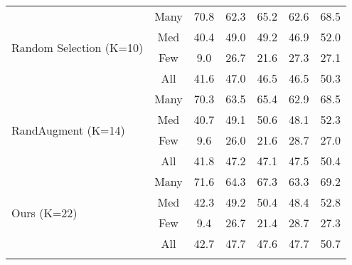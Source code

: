 \documentclass{article}
\newcommand{\thickhline}{\hlineB{4}}
\begin{document}
{\begin{table}[ht]
{{\begin{tabular}{l|c|ccccc}
\multirow{4}{*}{Random Selection (K=10)}                      & Many                         & 70.8                   & 62.3                       & 65.2                         & 62.6                   & 68.5                     \\
                                                & Med                          & 40.4                   & 49.0                       & 49.2                         & 46.9                   & 52.0                     \\
                                                & Few                          & 9.0                    & 26.7                       & 21.6                         & 27.3                   & 27.1                     \\
                                                & All                          & 41.6                   & 47.0                       & 46.5                         & 46.5                   & 50.3                     \\  \midrule
\multirow{4}{*}{RandAugment (K=14)}                    & Many                         & 70.3                   & 63.5                       & 65.4                         & 62.9                   & 68.5                     \\
                                                & Med                          & 40.7                   & 49.1                       & 50.6                         & 48.1                   & 52.3                     \\
                                                & Few                          & 9.6                    & 26.0                       & 21.6                         & 28.7                   & 27.0                     \\
                                                & All                          & 41.8                   & 47.2                       & 47.1                         & 47.5                   & 50.4                     \\  \midrule
\multirow{4}{*}{Ours (K=22)}                    & Many                         & 71.6                   & 64.3                       & 67.3                         & 63.3                   & 69.2                     \\
                                                & Med                          & 42.3                   & 49.2                       & 50.4                         & 48.4                   & 52.8                     \\
                                                & Few                          & 9.4                    & 26.7                       & 21.4                         & 28.7                   & 27.3                     \\
                                                & All                          & 42.7                   & 47.7                       & 47.6                         & 47.7                   & 50.7   \\
\thickhline
\end{tabular}}}
\end{table} }
\end{document}
